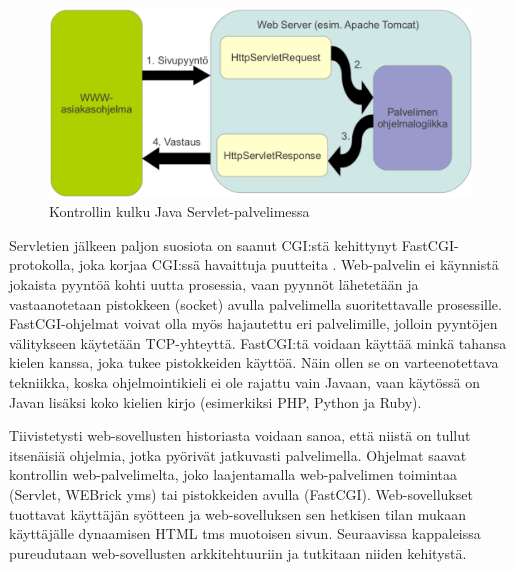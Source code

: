 \begin{figure}[ht]
\centering
\includegraphics[width=\textwidth]{web/servlet.eps}
\caption{Kontrollin kulku Java Servlet-palvelimessa}%
\label{servlet}
\end{figure}

Servletien jälkeen paljon suosiota on saanut CGI:stä kehittynyt FastCGI-protokolla, joka korjaa CGI:ssä havaittuja puutteita \cite{fastcgi}. Web-palvelin ei käynnistä jokaista pyyntöä kohti uutta prosessia, vaan pyynnöt lähetetään ja vastaanotetaan pistokkeen (socket) avulla palvelimella suoritettavalle prosessille. FastCGI-ohjelmat voivat olla myös hajautettu eri palvelimille, jolloin pyyntöjen välitykseen käytetään TCP-yhteyttä. FastCGI:tä voidaan käyttää minkä tahansa kielen kanssa, joka tukee pistokkeiden käyttöä. Näin ollen se on varteenotettava tekniikka, koska ohjelmointikieli ei ole rajattu vain Javaan, vaan käytössä on Javan lisäksi koko kielien kirjo (esimerkiksi PHP, Python ja Ruby).

Tiivistetysti web-sovellusten historiasta voidaan sanoa, että niistä on tullut itsenäisiä ohjelmia, jotka pyörivät jatkuvasti palvelimella. Ohjelmat saavat kontrollin web-palvelimelta, joko laajentamalla web-palvelimen toimintaa (Servlet, WEBrick yms) tai pistokkeiden avulla (FastCGI). Web-sovellukset tuottavat käyttäjän syötteen ja web-sovelluksen sen hetkisen tilan mukaan käyttäjälle dynaamisen HTML tms muotoisen sivun. Seuraavissa kappaleissa pureudutaan web-sovellusten arkkitehtuuriin ja tutkitaan niiden kehitystä.